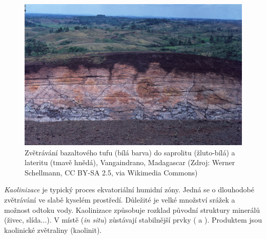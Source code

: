 \begin{figure}[h]
	\centering
	\includegraphics[width=1\linewidth]{obrazky/zvetravani/laterit}
	\caption{Zvětrávání bazaltového tufu (bílá barva) do saprolitu (žluto-bílá) a lateritu (tmavě hnědá), Vangaindrano, Madagascar (Zdroj: Werner Schellmann, CC BY-SA 2.5, via Wikimedia Commons)}
	\label{fig:laterit}
\end{figure}


\emph{Kaolinizace} je typický proces ekvatoriální humidní zóny. Jedná se o dlouhodobé zvětrávání ve slabě kyselém prostředí. Důležité je velké množství srážek a možnost odtoku vody. Kaolinizace způsobuje rozklad původní struktury minerálů (živec, slída...). V místě (\textit{in situ}) zůstávají stabilnější prvky ( a ). Produktem jsou kaolinické zvětraliny (kaolinit).


%
%
%




